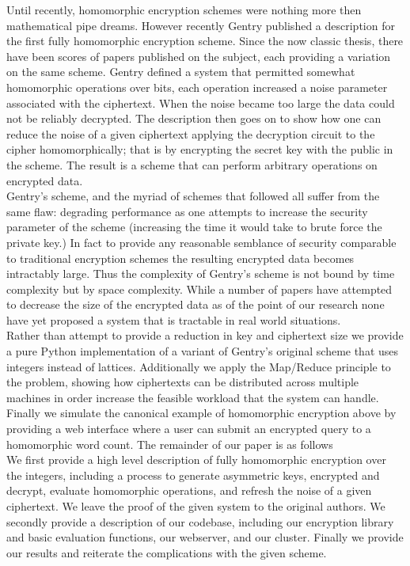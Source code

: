 \documentclass[letterpaper,11pt]{article} %
\begin{document}
	Until recently, homomorphic encryption schemes were nothing more then mathematical pipe dreams. However recently Gentry published a description for the first fully homomorphic encryption scheme. Since the now classic thesis, there have been scores of papers published on the subject, each providing a variation on the same scheme. Gentry defined a system that permitted somewhat homomorphic operations over bits, each operation increased a noise parameter associated with the ciphertext. When the noise became too large the data could not be reliably decrypted. The description then goes on to show how one can reduce the noise of a given ciphertext applying the decryption circuit to the cipher homomorphically; that is by encrypting the secret key with the public in the scheme. The result is a scheme that can perform arbitrary operations on encrypted data.\\

	Gentry's scheme, and the myriad of schemes that followed all suffer from the same flaw: degrading performance as one attempts to increase the security parameter of the scheme (increasing the time it would take to brute force the private key.) In fact to provide any reasonable semblance of security comparable to traditional encryption schemes the resulting encrypted data becomes intractably large. Thus the complexity of Gentry's scheme is not bound by time complexity but by space complexity. While a number of papers have attempted to decrease the size of the encrypted data as of the point of our research none have yet proposed a system that is tractable in real world situations.\\

	Rather than attempt to provide a reduction in key and ciphertext size we provide a pure Python implementation of a variant of Gentry's original scheme that uses integers instead of lattices. Additionally we apply the Map/Reduce principle to the problem, showing how ciphertexts can be distributed across multiple machines in order increase the feasible workload that the system can handle. Finally we simulate the canonical example of homomorphic encryption above by providing a web interface where a user can submit an encrypted query to a homomorphic word count. The remainder of our paper is as follows\\

	We first provide a high level description of fully homomorphic encryption over the integers, including a process to generate asymmetric keys, encrypted and decrypt, evaluate homomorphic operations, and refresh the noise of a given ciphertext. We leave the proof of the given system to the original authors. We secondly provide a description of our codebase, including our encryption library and basic evaluation functions, our webserver, and our cluster. Finally we provide our results and reiterate the complications with the given scheme.
\end{document}
